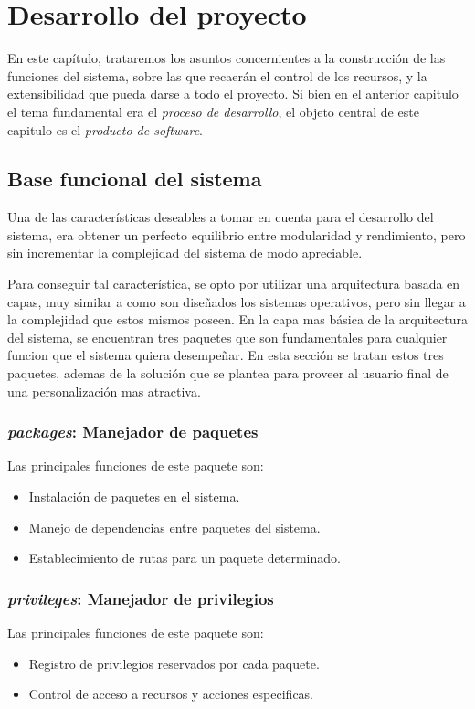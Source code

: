 \chapter{Desarrollo del proyecto}

En este capítulo, trataremos los asuntos concernientes a la construcción de las
funciones del sistema, sobre las que recaerán el control de los recursos, y la
extensibilidad que pueda darse a todo el proyecto. Si bien en el anterior
capitulo el tema fundamental era el \emph{proceso de desarrollo}, el objeto
central de este capitulo es el \emph{producto de software}.

\section{Base funcional del sistema}
Una de las características deseables a tomar en cuenta para el desarrollo del
sistema, era obtener un perfecto equilibrio entre modularidad y rendimiento,
pero sin incrementar la complejidad del sistema de modo apreciable.

Para conseguir tal característica, se opto por utilizar una arquitectura basada
en capas, muy similar a como son diseñados los sistemas operativos, pero sin
llegar a la complejidad que estos mismos poseen. En la capa mas básica de la
arquitectura del sistema, se encuentran tres paquetes que son fundamentales para
cualquier funcion que el sistema quiera desempeñar. En esta sección se tratan
estos tres paquetes, ademas de la solución que se plantea para proveer al
usuario final de una personalización mas atractiva.

\subsection{\emph{packages}: Manejador de paquetes}
Las principales funciones de este paquete son:
\begin{itemize}
\item Instalación de paquetes en el sistema.
\item Manejo de dependencias entre paquetes del sistema.
\item Establecimiento de rutas para un paquete determinado.
\end{itemize}

\subsection{\emph{privileges}: Manejador de privilegios}
Las principales funciones de este paquete son:
\begin{itemize}
\item Registro de privilegios reservados por cada paquete.
\item Control de acceso a recursos y acciones especificas.
\end{itemize}

